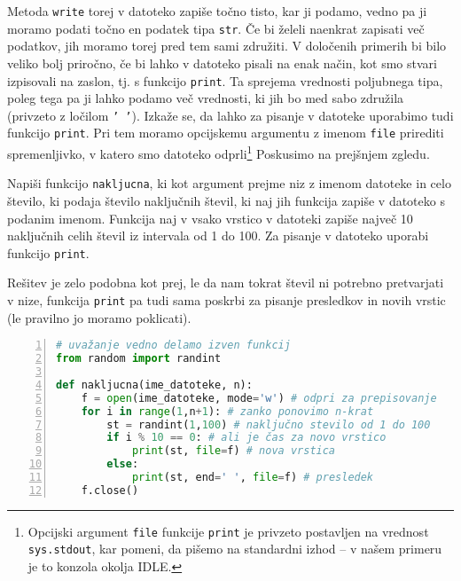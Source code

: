 Metoda \texttt{write} torej v datoteko zapiše točno tisto, kar ji podamo, vedno pa ji moramo podati točno en podatek tipa \texttt{str}. Če bi želeli naenkrat zapisati več podatkov, jih moramo torej pred tem sami združiti. V določenih primerih bi bilo veliko bolj priročno, če bi lahko v datoteko pisali na enak način, kot smo stvari izpisovali na zaslon, tj. s funkcijo \texttt{print}. Ta sprejema vrednosti poljubnega tipa, poleg tega pa ji lahko podamo več vrednosti, ki jih bo med sabo združila (privzeto z ločilom \texttt{' '}). Izkaže se, da lahko za pisanje v datoteke uporabimo tudi funkcijo \texttt{print}. Pri tem moramo opcijskemu argumentu z imenom \texttt{file} prirediti spremenljivko, v katero smo datoteko odprli\footnote{Opcijski argument \texttt{file} funkcije \texttt{print} je privzeto postavljen na vrednost \texttt{sys.stdout}, kar pomeni, da pišemo na standardni izhod -- v našem primeru je to konzola okolja IDLE.} Poskusimo na prejšnjem zgledu.
\begin{zgled}
Napiši funkcijo \texttt{nakljucna}, ki kot argument prejme niz z imenom datoteke in celo število, ki podaja število naključnih števil, ki naj jih funkcija zapiše v datoteko s podanim imenom. Funkcija naj v vsako vrstico v datoteki zapiše največ 10 naključnih celih števil iz intervala od 1 do 100. Za pisanje v datoteko uporabi funkcijo \texttt{print}.
\end{zgled}
\begin{resitev}
Rešitev je zelo podobna kot prej, le da nam tokrat števil ni potrebno pretvarjati v nize, funkcija \texttt{print} pa tudi sama poskrbi za pisanje presledkov in novih vrstic (le pravilno jo moramo poklicati).
\begin{lstlisting}[language=Python, showstringspaces=false,numbers=left]
# uvažanje vedno delamo izven funkcij
from random import randint

def nakljucna(ime_datoteke, n):
    f = open(ime_datoteke, mode='w') # odpri za prepisovanje
    for i in range(1,n+1): # zanko ponovimo n-krat
        st = randint(1,100) # naključno stevilo od 1 do 100
        if i % 10 == 0: # ali je čas za novo vrstico
            print(st, file=f) # nova vrstica
        else:
            print(st, end=' ', file=f) # presledek 
    f.close()
\end{lstlisting}
\end{resitev}

